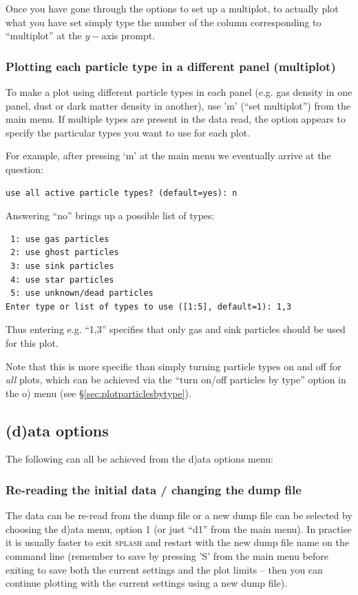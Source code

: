 \documentclass[a4paper,10pt]{article}
\newcommand{\splash}{\textsc{splash }}
\begin{document}
Once you have gone through the options to set up a multiplot, to actually plot what you have set simply type the number of the column corresponding to ``multiplot'' at the $y-$axis prompt.

\subsubsection{ Plotting each particle type in a different panel (multiplot)}
 To make a plot using different particle types in each panel (e.g. gas density in one panel, dust or dark matter density in another), use 'm' (``set multiplot'') from the main menu. If multiple types are present in the data read, the option appears to specify the particular types you want to use for each plot.
 
 For example, after pressing `m' at the main menu we eventually arrive at the question:
\begin{verbatim}
use all active particle types? (default=yes): n
\end{verbatim}
Answering ``no'' brings up a possible list of types:
\begin{verbatim}
 1: use gas particles
 2: use ghost particles
 3: use sink particles
 4: use star particles
 5: use unknown/dead particles
Enter type or list of types to use ([1:5], default=1): 1,3
\end{verbatim}
Thus entering e.g. ``1,3'' specifies that only gas and sink particles should be used for this plot.

Note that this is more specific than simply turning particle types on and off for \emph{all} plots, which can be achieved via the ``turn on/off particles by type'' option in the o) menu (see \S\ref{sec:plotparticlesbytype}).

\subsection{(d)ata options}%
The following can all be achieved from the d)ata options menu:

\subsubsection{ Re-reading the initial data / changing the dump file}
\label{sec:d1}
 The data can be re-read from the dump file or a new dump file can be selected by choosing  the d)ata menu, option 1 (or just ``d1'' from the main menu). In practise it is usually faster to exit \splash and restart with the new dump file name on the command line (remember to save by pressing 'S' from the main menu before exiting to save both the current settings and the plot limits -- then you can continue plotting with the current settings using a new dump file).
 
\end{document}
